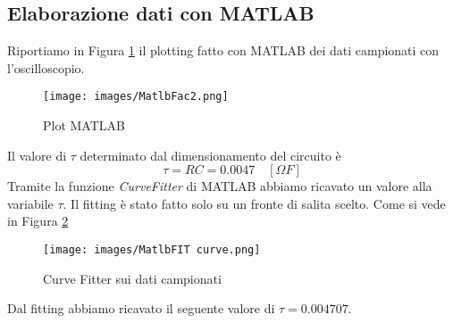 \subsection{Elaborazione dati con MATLAB\textregistered\xspace}
Riportiamo in Figura \ref{fig:MatlabPlot} il plotting fatto con MATLAB\textregistered\xspace dei dati campionati con l'oscilloscopio.
\begin{figure}[H]
    \centering
    \texttt{[image: images/MatlbFac2.png]}
    \caption{Plot MATLAB\textregistered\xspace}
    \label{fig:MatlabPlot}
\end{figure}
Il valore di $\tau$ determinato dal dimensionamento del circuito è
\begin{equation*}
    \tau=RC=0.0047 \quad[\Omega F]
\end{equation*}
Tramite la funzione \textit{CurveFitter} di MATLAB\textregistered\xspace abbiamo ricavato un valore alla variabile $\tau$. Il fitting è stato fatto solo su un fronte di salita scelto. Come si vede in Figura \ref{fig:MatlabFit}
\begin{figure}[H]
    \centering
    \texttt{[image: images/MatlbFIT curve.png]}
    \caption{Curve Fitter sui dati campionati}
    \label{fig:MatlabFit}
\end{figure}
Dal fitting abbiamo ricavato il seguente valore di $\tau = 0.004707$.